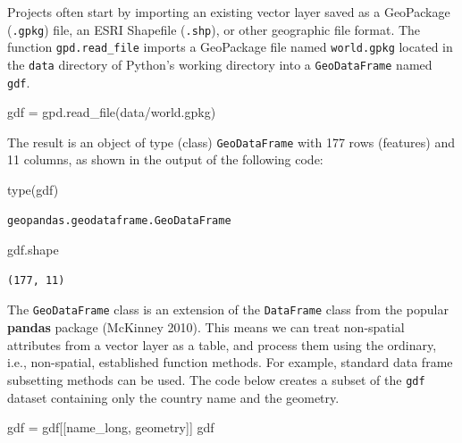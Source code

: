 \documentclass[
  letterpaper,
]{krantz}
\newenvironment{Shaded}{\begin{snugshade}}{\end{snugshade}}
\newcommand{\BuiltInTok}[1]{\textcolor[rgb]{0.00,0.23,0.31}{#1}}
\newcommand{\NormalTok}[1]{\textcolor[rgb]{0.00,0.23,0.31}{#1}}
\newcommand{\OperatorTok}[1]{\textcolor[rgb]{0.37,0.37,0.37}{#1}}
\newcommand{\StringTok}[1]{\textcolor[rgb]{0.13,0.47,0.30}{#1}}
\begin{document}
Projects often start by importing an existing vector layer saved as a
GeoPackage (\texttt{.gpkg}) file, an ESRI Shapefile (\texttt{.shp}), or
other geographic file format. The function \texttt{gpd.read\_file}
imports a GeoPackage file named \texttt{world.gpkg} located in the
\texttt{data} directory of Python's working directory into a
\texttt{GeoDataFrame} named \texttt{gdf}.

\begin{Shaded}
\begin{Highlighting}[]
\NormalTok{gdf }\OperatorTok{=}\NormalTok{ gpd.read\_file(}\StringTok{\textquotesingle{}data/world.gpkg\textquotesingle{}}\NormalTok{)}
\end{Highlighting}
\end{Shaded}

The result is an object of type (class) \texttt{GeoDataFrame} with 177
rows (features) and 11 columns, as shown in the output of the following
code:

\begin{Shaded}
\begin{Highlighting}[]
\BuiltInTok{type}\NormalTok{(gdf)}
\end{Highlighting}
\end{Shaded}

\label{typegdf}
\begin{verbatim}
geopandas.geodataframe.GeoDataFrame
\end{verbatim}

\begin{Shaded}
\begin{Highlighting}[]
\NormalTok{gdf.shape}
\end{Highlighting}
\end{Shaded}

\begin{verbatim}
(177, 11)
\end{verbatim}

The \texttt{GeoDataFrame} class is an extension of the
\texttt{DataFrame} class from the popular \textbf{pandas} package
(McKinney 2010). This means we can treat non-spatial attributes from a
vector layer as a table, and process them using the ordinary, i.e.,
non-spatial, established function methods. For example, standard data
frame subsetting methods can be used. The code below creates a subset of
the \texttt{gdf} dataset containing only the country name and the
geometry.

\begin{Shaded}
\begin{Highlighting}[]
\NormalTok{gdf }\OperatorTok{=}\NormalTok{ gdf[[}\StringTok{\textquotesingle{}name\_long\textquotesingle{}}\NormalTok{, }\StringTok{\textquotesingle{}geometry\textquotesingle{}}\NormalTok{]]}
\NormalTok{gdf}
\end{Highlighting}
\end{Shaded}
\end{document}
